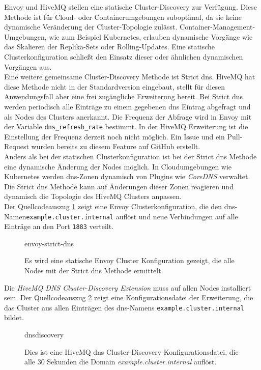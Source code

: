 Envoy und HiveMQ stellen eine statische Cluster-Discovery zur Verfügung. Diese Methode ist für Cloud- oder Containerumgebungen suboptimal, da sie keine dynamische Veränderung der Cluster-Topologie zulässt. Container-Management-Umgebungen, wie zum Beispiel Kubernetes, erlauben dynamische Vorgänge wie das Skalieren der Replika-Sets oder Rolling-Updates. Eine statische Clusterkonfiguration schlie{\ss}t den Einsatz dieser oder ähnlichen dynamischen Vorgängen aus.\\
Eine weitere gemeinsame Cluster-Discovery Methode ist Strict \ac{dns}. HiveMQ hat diese Methode nicht in der Standardversion eingebaut, stellt für diesen Anwendungsfall aber eine frei zugängliche Erweiterung bereit.
Bei Strict \ac{dns} werden periodisch alle Einträge zu einem gegebenen \ac{dns} Eintrag abgefragt und als Nodes des Clusters anerkannt. Die Frequenz der Abfrage wird in Envoy mit der Variable \verb|dns_refresh_rate| bestimmt. In der HiveMQ Erweiterung ist die Einstellung der Frequenz derzeit noch nicht möglich. Ein Issue \cite{AllowConfigurationDiscovery} und ein Pull-Request \cite{ExponentialBackoffGeneral} wurden bereits zu diesem Feature auf GitHub erstellt.
\\
Anders als bei der statischen Clusterkonfiguration ist bei der Strict \ac{dns} Methode eine dynamische Änderung der Nodes möglich. In Cloudumgebungen wie Kubernetes werden \ac{dns}-Zonen dynamisch von Plugins wie \textit{CoreDNS} verwaltet.\cite{DNSServicesPods}
Die Strict \ac{dns} Methode kann auf Änderungen dieser Zonen reagieren und dynamisch die Topologie des HiveMQ Clusters anpassen.
\\
Der Quellcodeauszug \ref{code:envoy-strict-dns} zeigt eine Envoy Clusterkonfiguration, die den \ac{dns}-Namen\newline \verb|example.cluster.internal| auflöst und neue Verbindungen auf alle Einträge an den Port \verb|1883| verteilt.
\begin{figure}
    {envoy-strict-dns}
    \caption{Es wird eine statische Envoy Cluster Konfiguration gezeigt, die alle Nodes mit der Strict \ac{dns} Methode ermittelt.}
    \label{code:envoy-strict-dns}
\end{figure}
Die \textit{HiveMQ DNS Cluster-Discovery Extension} \cite{HiveMQExtensionDNS} muss auf allen Nodes installiert sein. Der Quellcodeauszug \ref{code:hivemq-dnsdiscovery} zeigt eine Konfigurationsdatei der Erweiterung, die das Cluster aus allen Einträgen des \ac{dns}-Namens \verb|example.cluster.internal| bildet.
\begin{figure}
    {dnsdiscovery}
    \caption{Dies ist eine HiveMQ \ac{dns} Cluster-Discovery Konfigurationsdatei, die alle 30 Sekunden die Domain \textit{example.cluster.internal} auflöst.}
    \label{code:hivemq-dnsdiscovery}
\end{figure}

